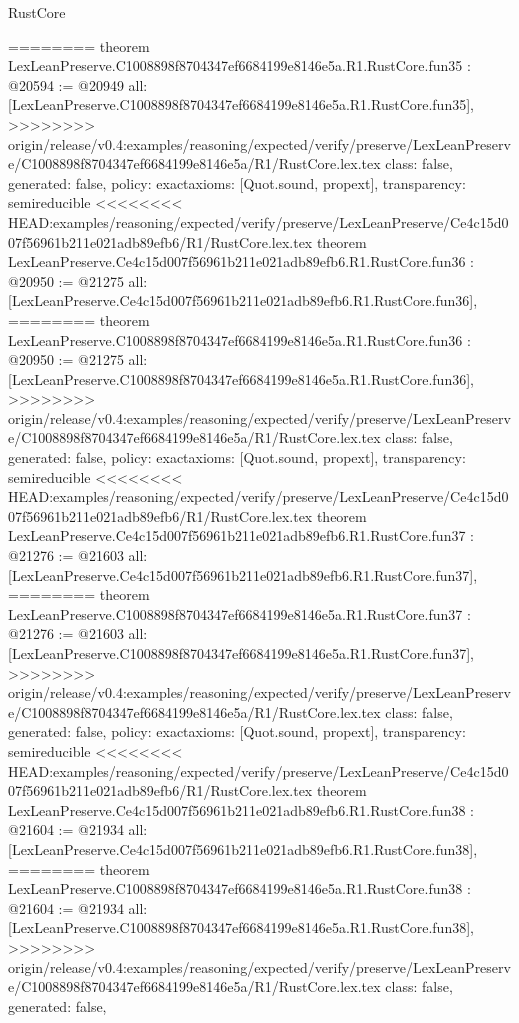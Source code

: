 \begin{lexlean}{RustCore}
\begin{coremodule}
{\begin{coremodule}
{{{{{{{{{{{{{{{{{{{{{{{{{{{{{{{{{{{{{{========
theorem LexLeanPreserve.C1008898f8704347ef6684199e8146e5a.R1.RustCore.fun35 : @20594 := @20949 {
  all: [LexLeanPreserve.C1008898f8704347ef6684199e8146e5a.R1.RustCore.fun35],
>>>>>>>> origin/release/v0.4:examples/reasoning/expected/verify/preserve/LexLeanPreserve/C1008898f8704347ef6684199e8146e5a/R1/RustCore.lex.tex
  class: false,
  generated: false,
  policy: exact{axioms: [Quot.sound, propext]},
  transparency: semireducible
}
<<<<<<<< HEAD:examples/reasoning/expected/verify/preserve/LexLeanPreserve/Ce4c15d007f56961b211e021adb89efb6/R1/RustCore.lex.tex
theorem LexLeanPreserve.Ce4c15d007f56961b211e021adb89efb6.R1.RustCore.fun36 : @20950 := @21275 {
  all: [LexLeanPreserve.Ce4c15d007f56961b211e021adb89efb6.R1.RustCore.fun36],
========
theorem LexLeanPreserve.C1008898f8704347ef6684199e8146e5a.R1.RustCore.fun36 : @20950 := @21275 {
  all: [LexLeanPreserve.C1008898f8704347ef6684199e8146e5a.R1.RustCore.fun36],
>>>>>>>> origin/release/v0.4:examples/reasoning/expected/verify/preserve/LexLeanPreserve/C1008898f8704347ef6684199e8146e5a/R1/RustCore.lex.tex
  class: false,
  generated: false,
  policy: exact{axioms: [Quot.sound, propext]},
  transparency: semireducible
}
<<<<<<<< HEAD:examples/reasoning/expected/verify/preserve/LexLeanPreserve/Ce4c15d007f56961b211e021adb89efb6/R1/RustCore.lex.tex
theorem LexLeanPreserve.Ce4c15d007f56961b211e021adb89efb6.R1.RustCore.fun37 : @21276 := @21603 {
  all: [LexLeanPreserve.Ce4c15d007f56961b211e021adb89efb6.R1.RustCore.fun37],
========
theorem LexLeanPreserve.C1008898f8704347ef6684199e8146e5a.R1.RustCore.fun37 : @21276 := @21603 {
  all: [LexLeanPreserve.C1008898f8704347ef6684199e8146e5a.R1.RustCore.fun37],
>>>>>>>> origin/release/v0.4:examples/reasoning/expected/verify/preserve/LexLeanPreserve/C1008898f8704347ef6684199e8146e5a/R1/RustCore.lex.tex
  class: false,
  generated: false,
  policy: exact{axioms: [Quot.sound, propext]},
  transparency: semireducible
}
<<<<<<<< HEAD:examples/reasoning/expected/verify/preserve/LexLeanPreserve/Ce4c15d007f56961b211e021adb89efb6/R1/RustCore.lex.tex
theorem LexLeanPreserve.Ce4c15d007f56961b211e021adb89efb6.R1.RustCore.fun38 : @21604 := @21934 {
  all: [LexLeanPreserve.Ce4c15d007f56961b211e021adb89efb6.R1.RustCore.fun38],
========
theorem LexLeanPreserve.C1008898f8704347ef6684199e8146e5a.R1.RustCore.fun38 : @21604 := @21934 {
  all: [LexLeanPreserve.C1008898f8704347ef6684199e8146e5a.R1.RustCore.fun38],
>>>>>>>> origin/release/v0.4:examples/reasoning/expected/verify/preserve/LexLeanPreserve/C1008898f8704347ef6684199e8146e5a/R1/RustCore.lex.tex
  class: false,
  generated: false,
}}}}}}}}}}}}}}}}}}}}}}}}}}}}}}}}}}}}}}}}}}
\end{coremodule}}
\end{coremodule}
\end{lexlean}
